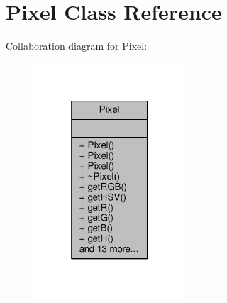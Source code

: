 \hypertarget{classPixel}{}\section{Pixel Class Reference}
\label{classPixel}


Collaboration diagram for Pixel\+:
\nopagebreak
\begin{figure}[H]
\begin{center}
\leavevmode
\includegraphics[width=160pt]{classPixel__coll__graph}
\end{center}
\end{figure}
